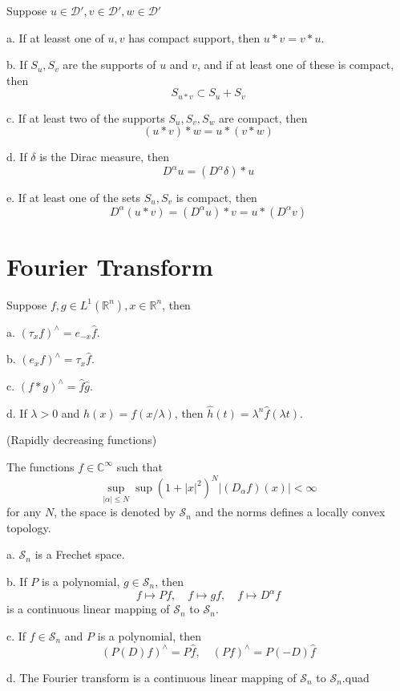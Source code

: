 \documentclass[lang=en, color=blue, ]{elegantbook}
\newcommand{\R}{\mathbb{R}}
\newcommand{\C}{\mathbb{C}}
\newcommand{\D}{\mathscr{D}}
\newcommand{\Sch}{\mathcal{S}}
\begin{document}
\begin{theorem}
    Suppose $u \in \D', v\in \D', w\in \D'$\par
    a. If at leasst one of $u,v$ has compact support, then $u*v = v*u$.\par
    b. If $S_u, S_v$ are the supports of $u$ and $v$, and if at least one of these is compact, then
    \[S_{u*v} \subset S_u + S_v\]\par
    c. If at least two of the supports $S_u,S_v,S_w$ are compact, then
    \[(u*v)*w = u*(v*w)\]\par
    d. If $\delta$ is the Dirac measure, then
    \[
    D^{\alpha}u = (D^{\alpha}\delta)*u
    \]\par
    e. If at least one of the sets $S_u,S_v$ is compact, then
    \[D^{\alpha}(u*v) = (D^{\alpha}u)*v = u*(D^{\alpha} v)\]
\end{theorem}

\chapter{Fourier Transform}

\begin{theorem}
    Suppose $f,g \in L^1(\R^n), x\in \R^n$, then\par
    a. $(\tau_x f)^{\wedge} = e_{-x}\hat{f}$.\par
    b. $(e_x f)^{\wedge} = \tau_x\hat{f}$.\par
    c. $(f*g)^{\wedge} = \hat{f}\hat{g}$.\par
    d. If $\lambda > 0$ and $h(x) = f(x/\lambda)$, then $\hat{h}(t) = \lambda^n\hat{f}(\lambda t)$.
\end{theorem}

\begin{definition}
    (Rapidly decreasing functions)\par
    The functions $f\in\C^{\infty}$ such that
    \[
    \sup_{|\alpha| \leq N}\sup(1+|x|^2)^N|(D_{\alpha} f)(x)| < \infty
    \]
    for any $N$, the space is denoted by $\Sch_n$ and the norms defines a locally convex topology.
\end{definition}

\begin{theorem}
    a. $\Sch_n$ is a Frechet space.\par
    b. If $P$ is a polynomial, $g\in \Sch_n$, then
    \[f\mapsto Pf,\quad f\mapsto gf,\quad f\mapsto D^{\alpha}f\]
    is a continuous linear mapping of $\Sch_n$ to $\Sch_n$.\par
    c. If $f\in \Sch_n$ and $P$ is a polynomial, then
    \[
    (P(D)f)^{\wedge} = P\hat{f},\quad (Pf)^{\wedge} = P(-D)\hat{f}
    \]\par
    d. The Fourier transform is a continuous linear mapping of $\Sch_n$ to $\Sch_n$.quad
\end{theorem}
\end{document}

